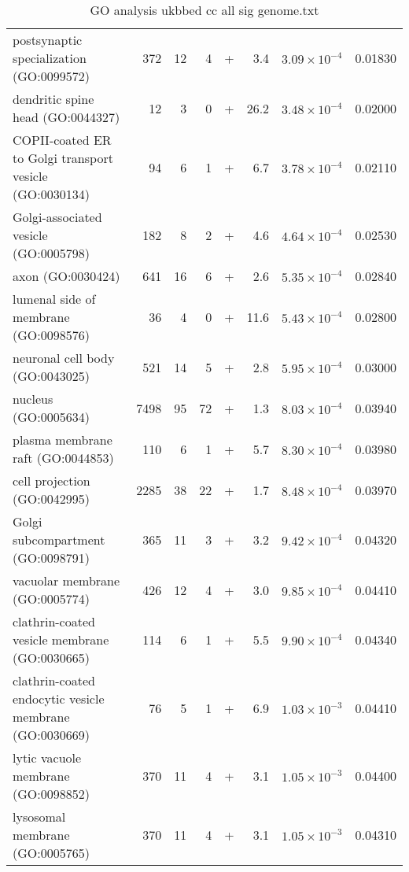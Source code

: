 \begin{table}[ht]
\begin{adjustbox}{width=\textwidth}
\begin{tabular}{lrrrlrrr}
  postsynaptic specialization (GO:0099572) & 372 & 12 & 4 & + & 3.4 & $3.09 \times 10^{-4}$ & 0.01830 \\ 
  dendritic spine head (GO:0044327) & 12 & 3 & 0 & + & 26.2 & $3.48 \times 10^{-4}$ & 0.02000 \\ 
  COPII-coated ER to Golgi transport vesicle (GO:0030134) & 94 & 6 & 1 & + & 6.7 & $3.78 \times 10^{-4}$ & 0.02110 \\ 
  Golgi-associated vesicle (GO:0005798) & 182 & 8 & 2 & + & 4.6 & $4.64 \times 10^{-4}$ & 0.02530 \\ 
  axon (GO:0030424) & 641 & 16 & 6 & + & 2.6 & $5.35 \times 10^{-4}$ & 0.02840 \\ 
  lumenal side of membrane (GO:0098576) & 36 & 4 & 0 & + & 11.6 & $5.43 \times 10^{-4}$ & 0.02800 \\ 
  neuronal cell body (GO:0043025) & 521 & 14 & 5 & + & 2.8 & $5.95 \times 10^{-4}$ & 0.03000 \\ 
  nucleus (GO:0005634) & 7498 & 95 & 72 & + & 1.3 & $8.03 \times 10^{-4}$ & 0.03940 \\ 
  plasma membrane raft (GO:0044853) & 110 & 6 & 1 & + & 5.7 & $8.30 \times 10^{-4}$ & 0.03980 \\ 
  cell projection (GO:0042995) & 2285 & 38 & 22 & + & 1.7 & $8.48 \times 10^{-4}$ & 0.03970 \\ 
  Golgi subcompartment (GO:0098791) & 365 & 11 & 3 & + & 3.2 & $9.42 \times 10^{-4}$ & 0.04320 \\ 
  vacuolar membrane (GO:0005774) & 426 & 12 & 4 & + & 3.0 & $9.85 \times 10^{-4}$ & 0.04410 \\ 
  clathrin-coated vesicle membrane (GO:0030665) & 114 & 6 & 1 & + & 5.5 & $9.90 \times 10^{-4}$ & 0.04340 \\ 
  clathrin-coated endocytic vesicle membrane (GO:0030669) & 76 & 5 & 1 & + & 6.9 & $1.03 \times 10^{-3}$ & 0.04410 \\ 
  lytic vacuole membrane (GO:0098852) & 370 & 11 & 4 & + & 3.1 & $1.05 \times 10^{-3}$ & 0.04400 \\ 
  lysosomal membrane (GO:0005765) & 370 & 11 & 4 & + & 3.1 & $1.05 \times 10^{-3}$ & 0.04310 \\ 
   \hline
\end{tabular}
\end{adjustbox}
\caption{GO analysis ukbbed  cc  all  sig  genome.txt} 
\label{tab:GO analysis ukbbed cc all sig genome.txt}
\end{table}


